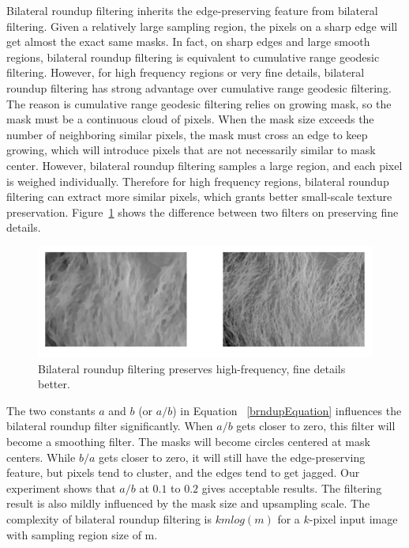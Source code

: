 Bilateral roundup filtering inherits the edge-preserving feature from bilateral filtering. Given a relatively large sampling region, the pixels on a sharp edge will get almost the exact same masks. In fact, on sharp edges and large smooth regions, bilateral roundup filtering is equivalent to cumulative range geodesic filtering. However, for high frequency regions or very fine details, bilateral roundup filtering has strong advantage over cumulative range geodesic filtering. The reason is cumulative range geodesic filtering relies on growing mask, so the mask must be a continuous cloud of pixels. When the mask size exceeds the number of neighboring similar pixels, the mask must cross an edge to keep growing, which will introduce pixels that are not necessarily similar to mask center. However, bilateral roundup filtering samples a large region, and each pixel is weighed individually. Therefore for high frequency regions, bilateral roundup filtering can extract more similar pixels, which grants better small-scale texture preservation. Figure~\ref{fig:comparisonBetweenTwoFilters} shows the difference between two filters on preserving fine details.

\begin{figure}[htbp]\centering
\includegraphics[width=1.0\textwidth]{f6}
\caption{Bilateral roundup filtering preserves high-frequency, fine details better.}
\label{fig:comparisonBetweenTwoFilters}
\end{figure}

The two constants $a$ and $b$ (or $a/b$) in Equation ~\ref{brndupEquation} influences the bilateral roundup filter significantly. When $a/b$ gets closer to zero, this filter will become a smoothing filter. The masks will become circles centered at mask centers. While $b/a$ gets closer to zero, it will still have the edge-preserving feature, but pixels tend to cluster, and the edges tend to get jagged.  Our experiment shows that $a/b$ at $0.1$ to $0.2$ gives acceptable results. The filtering result is also mildly influenced by the mask size and upsampling scale. The complexity of bilateral roundup filtering is $kmlog(m)$ for a $k$-pixel input image with sampling region size of m. 

